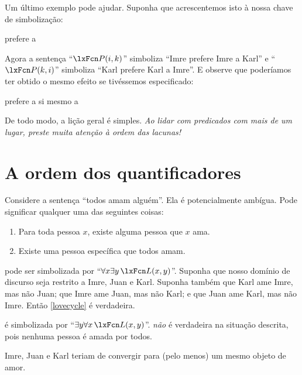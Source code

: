 Um último exemplo pode ajudar. Suponha que acrescentemos isto à nossa chave de simbolização:
\begin{ekey}
\item[\atom{P}{x,y}]  prefere  a 
\end{ekey}
Agora a sentença \textquotedblleft $\atom{P}{i,k}$\textquotedblright{} simboliza \textquotedblleft Imre prefere Imre a Karl\textquotedblright{} e \textquotedblleft $\atom{P}{k,i}$\textquotedblright{} simboliza \textquotedblleft Karl prefere Karl a Imre\textquotedblright{}. E observe que poderíamos ter obtido o mesmo efeito se tivéssemos especificado:
\begin{ekey}
\item[\atom{P}{x,y}]  prefere a si mesmo a 
\end{ekey}
De todo modo, a lição geral é simples. \emph{Ao lidar com predicados com mais de um lugar, preste muita atenção à ordem das lacunas!}


\section{A ordem dos quantificadores}\label{ss:OrderQuant}
Considere a sentença \textquotedblleft todos amam alguém\textquotedblright{}. Ela é potencialmente ambígua. Pode significar qualquer uma das seguintes coisas:
	\begin{enumerate}
\item\label{lovecycle} Para toda pessoa $x$, existe alguma pessoa que $x$ ama.
\item\label{loveconverge} Existe uma pessoa específica que todos amam.
	\end{enumerate}
 pode ser simbolizada por \textquotedblleft $\forall x \exists y\, \atom{L}{x,y}$\textquotedblright{}. Suponha que nosso domínio de discurso seja restrito a Imre, Juan e Karl. Suponha também que Karl ame Imre, mas não Juan; que Imre ame Juan, mas não Karl; e que Juan ame Karl, mas não Imre. Então \cref*{lovecycle} é verdadeira.

 é simbolizada por \textquotedblleft $\exists y \forall x\,
\atom{L}{x,y}$\textquotedblright{}.  \emph{não} é verdadeira na situação descrita, pois nenhuma pessoa é amada por todos.

Imre, Juan e Karl teriam de convergir para (pelo menos) um mesmo objeto de amor.


